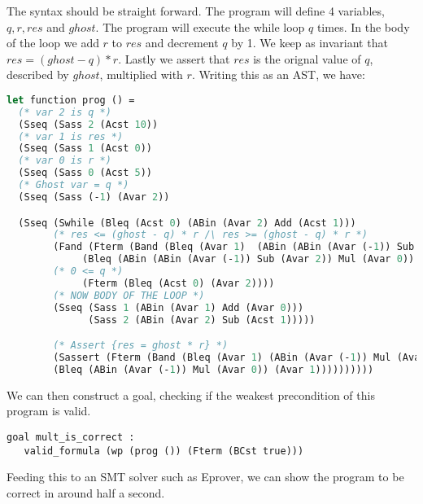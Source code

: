 The syntax should be straight forward. The program will define 4 variables, $q,r,res$ and $ghost$.
The program will execute the while loop $q$ times. In the body of the loop we add $r$ to $res$ and decrement $q$ by 1. We keep as invariant that $res = (ghost - q) * r$. Lastly we assert that $res$ is the orignal value of $q$, described by $ghost$, multiplied with $r$.
Writing this as an AST, we have:

\begin{lstlisting}[caption={WHILE AST in why3},label={lst:whileast},language=sml]
let function prog () =
  (* var 2 is q *)
  (Sseq (Sass 2 (Acst 10))
  (* var 1 is res *)
  (Sseq (Sass 1 (Acst 0))
  (* var 0 is r *)
  (Sseq (Sass 0 (Acst 5))
  (* Ghost var = q *)
  (Sseq (Sass (-1) (Avar 2))

  (Sseq (Swhile (Bleq (Acst 0) (ABin (Avar 2) Add (Acst 1)))
        (* res <= (ghost - q) * r /\ res >= (ghost - q) * r *)
        (Fand (Fterm (Band (Bleq (Avar 1)  (ABin (ABin (Avar (-1)) Sub (Avar 2)) Mul (Avar 0)))
             (Bleq (ABin (ABin (Avar (-1)) Sub (Avar 2)) Mul (Avar 0)) (Avar 1))))
        (* 0 <= q *)
             (Fterm (Bleq (Acst 0) (Avar 2))))
        (* NOW BODY OF THE LOOP *)
        (Sseq (Sass 1 (ABin (Avar 1) Add (Avar 0)))
              (Sass 2 (ABin (Avar 2) Sub (Acst 1)))))

        (* Assert {res = ghost * r} *)
        (Sassert (Fterm (Band (Bleq (Avar 1) (ABin (Avar (-1)) Mul (Avar 0)))
        (Bleq (ABin (Avar (-1)) Mul (Avar 0)) (Avar 1))))))))))
      \end{lstlisting}

We can then construct a goal, checking if the weakest precondition of this program is valid.

\begin{lstlisting}
goal mult_is_correct :
   valid_formula (wp (prog ()) (Fterm (BCst true)))
\end{lstlisting}

Feeding this to an SMT solver such as Eprover, we can show the program to be correct in around half a second.
